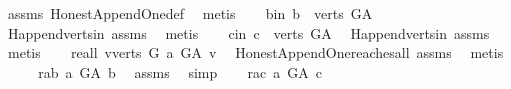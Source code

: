 \begin{isabellebody}
\ assms{\isacharparenleft}{\kern0pt}{}{\isacharparenright}{\kern0pt}\ Honest{\isacharunderscore}{\kern0pt}Append{\isacharunderscore}{\kern0pt}One{\isacharunderscore}{\kern0pt}def\ \isamarkupfalse%
\ metis\isanewline
\ \ \isamarkupfalse%
\ b{\isacharunderscore}{\kern0pt}in{\isacharcolon}{\kern0pt}\ {\isachardoublequoteopen}b\ {\isasymin}\ verts\ G{\isacharunderscore}{\kern0pt}A{\isachardoublequoteclose}\ \isamarkupfalse%
\ H{\isachardot}{\kern0pt}append{\isacharunderscore}{\kern0pt}verts{\isacharunderscore}{\kern0pt}in\ assms{\isacharparenleft}{\kern0pt}{}{\isacharparenright}{\kern0pt}\ \isamarkupfalse%
\ metis\isanewline
\ \ \isamarkupfalse%
\ c{\isacharunderscore}{\kern0pt}in{\isacharcolon}{\kern0pt}\ {\isachardoublequoteopen}c\ {\isasymin}\ verts\ G{\isacharunderscore}{\kern0pt}A{\isachardoublequoteclose}\ \isamarkupfalse%
\ H{\isachardot}{\kern0pt}append{\isacharunderscore}{\kern0pt}verts{\isacharunderscore}{\kern0pt}in\ assms{\isacharparenleft}{\kern0pt}{}{\isacharparenright}{\kern0pt}\ \isamarkupfalse%
\ metis\isanewline
\ \ \isamarkupfalse%
\ re{\isacharunderscore}{\kern0pt}all{\isacharcolon}{\kern0pt}\ {\isachardoublequoteopen}{\isasymforall}v{\isasymin}verts\ G{\isachardot}{\kern0pt}\ a\ {\isasymrightarrow}\isactrlsup {\isacharplus}{\kern0pt}\isactrlbsub G{\isacharunderscore}{\kern0pt}A\isactrlesub \ v{\isachardoublequoteclose}\ \isamarkupfalse%
\ Honest{\isacharunderscore}{\kern0pt}Append{\isacharunderscore}{\kern0pt}One{\isachardot}{\kern0pt}reaches{\isacharunderscore}{\kern0pt}all\ assms{\isacharparenleft}{\kern0pt}{}{\isacharparenright}{\kern0pt}\ \isamarkupfalse%
\ metis\isanewline
\ \ \isamarkupfalse%
\ \isamarkupfalse%
\ r{\isacharunderscore}{\kern0pt}ab{\isacharcolon}{\kern0pt}\ {\isachardoublequoteopen}a\ {\isasymrightarrow}\isactrlsup {\isacharplus}{\kern0pt}\isactrlbsub G{\isacharunderscore}{\kern0pt}A\isactrlesub \ b{\isachardoublequoteclose}\ \isamarkupfalse%
\ assms{\isacharparenleft}{\kern0pt}{}{\isacharparenright}{\kern0pt}\ \isamarkupfalse%
\ simp\isanewline
\ \ \isamarkupfalse%
\ r{\isacharunderscore}{\kern0pt}ac{\isacharcolon}{\kern0pt}\ {\isachardoublequoteopen}a\ {\isasymrightarrow}\isactrlsup {\isacharplus}{\kern0pt}\isactrlbsub G{\isacharunderscore}{\kern0pt}A\isactrlesub \ c{\isachardoublequoteclose}\ \isamarkupfalse%

\end{isabellebody}

